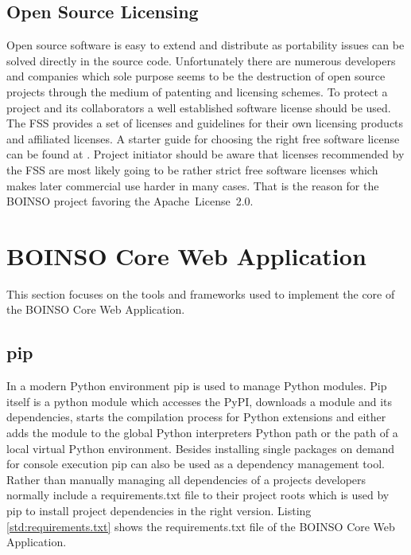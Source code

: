 \documentclass[BachelorPaper]{subfiles}
\begin{document}


\subsection{Open Source Licensing}
Open source software is easy to extend and distribute as portability issues can be solved directly in the source code. Unfortunately there are numerous developers and companies which sole purpose seems to be the destruction of open source projects through the medium of patenting and licensing schemes. To protect a project and its collaborators a well established software license should be used. The \ac{FSS} provides a set of licenses and guidelines for their own licensing products and affiliated licenses. A starter guide for choosing the right free software license can be found at \cite{fss_license_guide}. Project initiator should be aware that licenses recommended by the \ac{FSS} are most likely going to be rather strict free software licenses which makes later commercial use harder in many cases. That is the reason for the BOINSO project favoring the Apache~License~2.0.

\section{BOINSO Core Web Application}
This section focuses on the tools and frameworks used to implement the core of the BOINSO Core Web Application.

\subsection{pip}
In a modern Python environment pip is used to manage Python modules. Pip itself is a python module which accesses the \ac{PyPI}, downloads a module and its dependencies, starts the compilation process for Python extensions and either adds the module to the global Python interpreters Python path or the path of a local virtual Python environment. Besides installing single packages on demand for console execution pip can also be used as a dependency management tool. Rather than manually managing all dependencies of a projects developers normally include a requirements.txt file to their project roots which is used by pip to install project dependencies in the right version. Listing \ref{std:requirements.txt} shows the requirements.txt file of the BOINSO Core Web Application.\\
\end{document}
